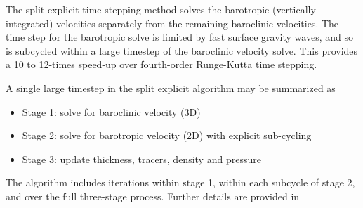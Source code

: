 The split explicit time-stepping method solves the barotropic (vertically-integrated) velocities separately from the remaining baroclinic velocities.  The time step for the barotropic solve is limited by fast surface gravity waves, and so is subcycled within a large timestep of the baroclinic velocity solve.  This provides a 10 to 12-times speed-up over fourth-order Runge-Kutta time stepping.

A single large timestep in the split explicit algorithm may be summarized as
\begin{itemize}
\item Stage 1: solve for baroclinic velocity (3D)
\item Stage 2: solve for barotropic velocity (2D) with explicit sub-cycling
\item Stage 3: update thickness, tracers, density and pressure
\end{itemize}
The algorithm includes iterations within stage 1, within each subcycle of stage 2, and over the full three-stage process.  Further details are provided in \citet[Appendix A.5]{Ringler_ea13om}
